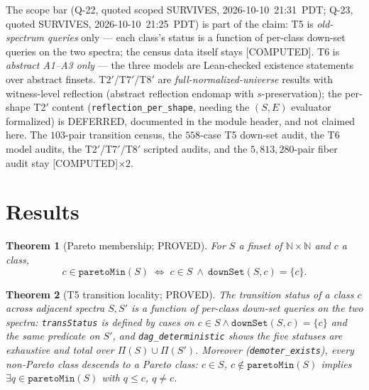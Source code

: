 \documentclass[11pt,a4paper]{article}
\newtheorem{theorem}{Theorem}
\theoremstyle{definition}
\begin{document}
The scope bar (Q-22, quoted scoped SURVIVES, 2026-10-10~21:31~PDT; Q-23,
quoted SURVIVES, 2026-10-10~21:25~PDT) is part of the claim:
T5 is \emph{old-spectrum queries} only --- each class's status is a
function of per-class down-set queries on the two spectra; the census
data itself stays [COMPUTED]. T6 is \emph{abstract A1--A3 only} --- the
three models are Lean-checked existence statements over abstract
finsets. T2$'$/T7$'$/T8$'$ are \emph{full-normalized-universe} results
with witness-level reflection (abstract reflection endomap with
$s$-preservation); the per-shape T2$'$ content
(\texttt{reflection\_per\_shape}, needing the $(S,E)$ evaluator
formalized) is DEFERRED, documented in the module header, and not
claimed here. The $103$-pair transition census, the $558$-case T5
down-set audit, the T6 model audits, the T2$'$/T7$'$/T8$'$ scripted
audits, and the $5{,}813{,}280$-pair fiber audit stay [COMPUTED]$\times2$.

\section{Results}

\begin{theorem}[Pareto membership; PROVED]
  \label{thm:pareto}
  For $S$ a finset of $\mathbb{N}\times\mathbb{N}$ and $c$ a class,
  \begin{equation}
    \label{eq:pareto}
    c\in\mathtt{paretoMin}(S)\;\Longleftrightarrow\;
    c\in S\ \land\ \mathtt{downSet}(S,c)=\{c\}.
  \end{equation}
\end{theorem}

\begin{theorem}[T5 transition locality; PROVED]
  \label{thm:t5}
  The transition status of a class $c$ across adjacent spectra $S,S'$
  is a function of per-class down-set queries on the two spectra:
  \texttt{transStatus} is defined by cases on
  $c\in S\land\mathtt{downSet}(S,c)=\{c\}$ and the same predicate on
  $S'$, and \texttt{dag\_deterministic} shows the five statuses are
  exhaustive and total over $\Pi(S)\cup\Pi(S')$. Moreover
  (\texttt{demoter\_exists}), every non-Pareto class descends to a
  Pareto class: $c\in S$, $c\notin\mathtt{paretoMin}(S)$ implies
  $\exists q\in\mathtt{paretoMin}(S)$ with $q\le c$, $q\neq c$.
\end{theorem}
\end{document}
